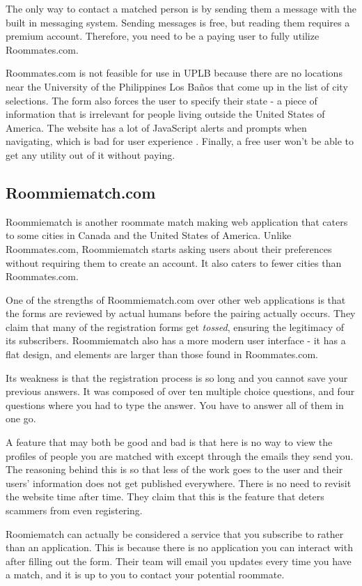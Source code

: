 \documentclass[journal]{./IEEE/IEEEtran}
\newcommand{\UPLB}{University of the Philippines Los Ba\~{n}os }
\begin{document}
The only way to contact a matched person is by sending them a message with the built in messaging system. Sending messages is free, but reading them requires a premium account. Therefore, you need to be a paying user to fully utilize Roommates.com.

Roommates.com is not feasible for use in UPLB because there are no locations near the \UPLB that come up in the list of city selections. The form also forces the user to specify their state - a piece of information that is irrelevant for people living outside the United States of America. The website has a lot of JavaScript alerts and prompts when navigating, which is bad for user experience \cite{UX1}. Finally, a free user won't be able to get any utility out of it without paying.

\subsection{Roommiematch.com}
Roommiematch is another roommate match making web application that caters to some cities in Canada and the United States of America. Unlike Roommates.com, Roommiematch starts asking users about their preferences without requiring them to create an account. It also caters to fewer cities than Roommates.com.

One of the strengths of Roommiematch.com over other web applications is that the forms are reviewed by actual humans before the pairing actually occurs. They claim that many of the registration forms get \textit{tossed}, ensuring the legitimacy of its subscribers. Roommiematch also has a more modern user interface - it has a flat design, and elements are larger than those found in Roommates.com.

Its weakness is that the registration process is so long and you cannot save your previous answers. It was composed of over ten multiple choice questions, and four questions where you had to type the answer. You have to answer all of them in one go.

A feature that may both be good and bad is that here is no way to view the profiles of people you are matched with except through the emails they send you. The reasoning behind this is so that less of the work goes to the user and their users' information does not get published everywhere. There is no need to revisit the website time after time. They claim that this is the feature that deters scammers from even registering.

Roomiematch can actually be considered a service that you subscribe to rather than an application. This is because there is no application you can interact with after filling out the form. Their team will email you updates every time you have a match, and it is up to you to contact your potential roommate.
\end{document}

